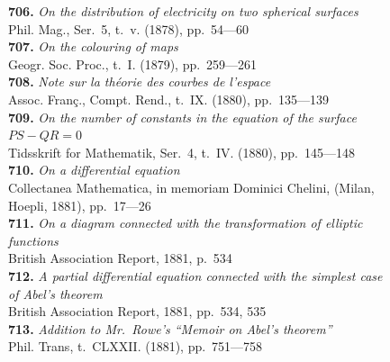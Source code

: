 \documentclass[11pt,a4paper]{book}
\begin{document}
\small
\noindent\textbf{706.} \textit{On the distribution of electricity on two spherical surfaces} \\
\hspace*{2em}Phil. Mag., Ser.~5, t.~v. (1878), pp.~54---60\\[0.3em]
\textbf{707.} \textit{On the colouring of maps} \\
\hspace*{2em}Geogr. Soc. Proc., t.~I. (1879), pp.~259---261\\[0.3em]
\textbf{708.} \textit{Note sur la th\'eorie des courbes de l'espace} \\
\hspace*{2em}Assoc. Fran\c{c}., Compt. Rend., t.~IX. (1880), pp.~135---139\\[0.3em]
\textbf{709.} \textit{On the number of constants in the equation of the surface}\\
\hspace*{2em}$PS - QR = 0$ \\
\hspace*{2em}Tidsskrift for Mathematik, Ser.~4, t.~IV. (1880), pp.~145---148\\[0.3em]
\textbf{710.} \textit{On a differential equation} \\
\hspace*{2em}Collectanea Mathematica, in memoriam Dominici Chelini, (Milan,\\
\hspace*{2em}Hoepli, 1881), pp.~17---26\\[0.3em]
\textbf{711.} \textit{On a diagram connected with the transformation of elliptic}\\
\hspace*{2em}\textit{functions} \\
\hspace*{2em}British Association Report, 1881, p.~534\\[0.3em]
\textbf{712.} \textit{A partial differential equation connected with the simplest case}\\
\hspace*{2em}\textit{of Abel's theorem} \\
\hspace*{2em}British Association Report, 1881, pp.~534, 535\\[0.3em]
\textbf{713.} \textit{Addition to Mr.~Rowe's ``Memoir on Abel's theorem''} \\
\hspace*{2em}Phil. Trans, t.~CLXXII. (1881), pp.~751---758
\end{document}
